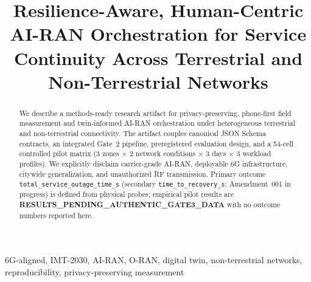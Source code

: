 \documentclass[conference]{IEEEtran}
\title{Resilience-Aware, Human-Centric AI-RAN Orchestration for Service Continuity Across Terrestrial and Non-Terrestrial Networks}
\author{\IEEEauthorblockN{Edmund Gunn Jr.}
\IEEEauthorblockA{\textit{7GC Research Product Spine}\\
Email: CITATION\_NEEDED}}
\begin{document}
\maketitle

\begin{abstract}
We describe a methods-ready research artifact for privacy-preserving, phone-first field measurement and twin-informed AI-RAN orchestration under heterogeneous terrestrial and non-terrestrial connectivity.
The artifact couples canonical JSON Schema contracts, an integrated Gate~2 pipeline, preregistered evaluation design, and a 54-cell controlled pilot matrix (3 zones $\times$ 2 network conditions $\times$ 3 days $\times$ 3 workload profiles).
We explicitly disclaim carrier-grade AI-RAN, deployable 6G infrastructure, citywide generalization, and unauthorized RF transmission.
Primary outcome \texttt{total\_service\_outage\_time\_s} (secondary \texttt{time\_to\_recovery\_s}; Amendment~001 in progress) is defined from physical probes; empirical pilot results are \textbf{RESULTS\_PENDING\_AUTHENTIC\_GATE3\_DATA} with no outcome numbers reported here.
\end{abstract}

\begin{IEEEkeywords}
6G-aligned, IMT-2030, AI-RAN, O-RAN, digital twin, non-terrestrial networks, reproducibility, privacy-preserving measurement
\end{IEEEkeywords}















\appendices

\end{document}
